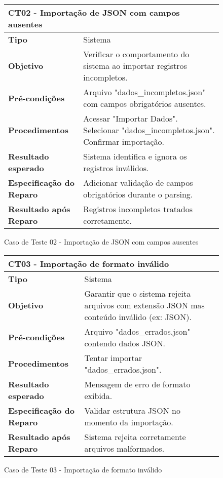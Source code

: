 \begin{figure}[H]
    \centering
\begin{longtable}{|p{}|p{}|}
\hline
\multicolumn{2}{|l|}{\textbf{CT02 - Importação de JSON com campos ausentes}} \\
\hline
\textbf{Tipo} & Sistema \\
\hline
\textbf{Objetivo} & Verificar o comportamento do sistema ao importar registros incompletos. \\
\hline
\textbf{Pré-condições} & Arquivo "dados\_incompletos.json" com campos obrigatórios ausentes. \\
\hline
\textbf{Procedimentos} & Acessar "Importar Dados". Selecionar "dados\_incompletos.json". Confirmar importação. \\
\hline
\textbf{Resultado esperado} & Sistema identifica e ignora os registros inválidos. \\
\hline
\textbf{Especificação do Reparo} & Adicionar validação de campos obrigatórios durante o parsing. \\
\hline
\textbf{Resultado após Reparo} & Registros incompletos tratados corretamente. \\
\hline
\end{longtable}
\caption{Caso de Teste 02 - Importação de JSON com campos ausentes}
\label{fig_ct02_importacao_json_campos_ausentes}
\end{figure}

\begin{figure}[H]
    \centering
\begin{longtable}{|p{}|p{}|}
\hline
\multicolumn{2}{|l|}{\textbf{CT03 - Importação de formato inválido}} \\
\hline
\textbf{Tipo} & Sistema \\
\hline
\textbf{Objetivo} & Garantir que o sistema rejeita arquivos com extensão JSON mas conteúdo inválido (ex: JSON). \\
\hline
\textbf{Pré-condições} & Arquivo "dados\_errados.json" contendo dados JSON. \\
\hline
\textbf{Procedimentos} & Tentar importar "dados\_errados.json". \\
\hline
\textbf{Resultado esperado} & Mensagem de erro de formato exibida. \\
\hline
\textbf{Especificação do Reparo} & Validar estrutura JSON no momento da importação. \\
\hline
\textbf{Resultado após Reparo} & Sistema rejeita corretamente arquivos malformados. \\
\hline
\end{longtable}
\caption{Caso de Teste 03 - Importação de formato inválido}
\label{fig_ct03_importacao_formato_invalido}
\end{figure}

